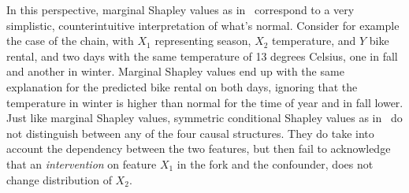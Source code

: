 \documentclass{article}
\begin{document}
In this perspective, marginal Shapley values as in~\cite{datta2016algorithmic,janzing2019feature,lundberg2020local} correspond to a very simplistic, counterintuitive interpretation of what's normal. Consider for example the case of the chain, with $X_1$ representing season, $X_2$ temperature, and $Y$ bike rental, and two days with the same temperature of 13 degrees Celsius, one in fall and another in winter. Marginal Shapley values end up with the same explanation for the predicted bike rental on both days, ignoring that the temperature in winter is higher than normal for the time of year and in fall lower. Just like marginal Shapley values, symmetric conditional Shapley values as in~\cite{aas2019explaining} do not distinguish between any of the four causal structures. They do take into account the dependency between the two features, but then fail to acknowledge that an {\em intervention} on feature $X_1$ in the fork and the confounder, does not change distribution of $X_2$.
\end{document}

